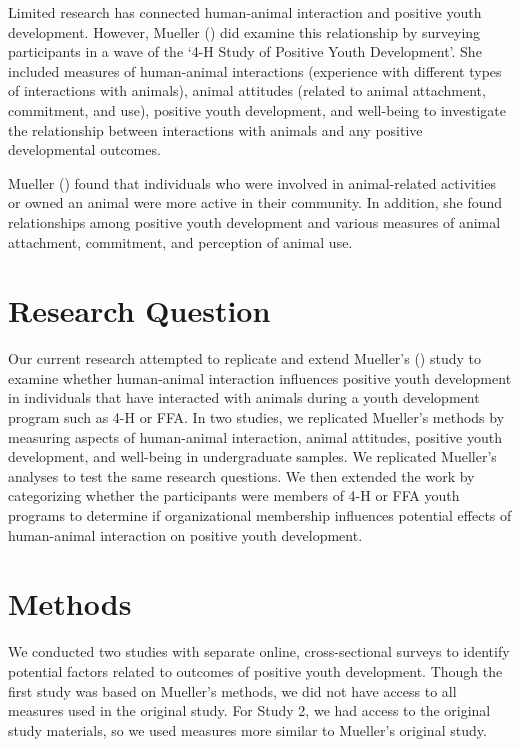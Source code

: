 \documentclass[
  jou,
  longtable,
  nolmodern,
  notxfonts,
  notimes,
  colorlinks=true,linkcolor=blue,citecolor=blue,urlcolor=blue]{apa7}
\begin{document}
Limited research has connected human-animal interaction and positive
youth development. However, Mueller ()
did examine this relationship by surveying participants in a wave of the
`4-H Study of Positive Youth Development'. She included measures of
human-animal interactions (experience with different types of
interactions with animals), animal attitudes (related to animal
attachment, commitment, and use), positive youth development, and
well-being to investigate the relationship between interactions with
animals and any positive developmental outcomes.

Mueller () found that individuals who
were involved in animal-related activities or owned an animal were more
active in their community. In addition, she found relationships among
positive youth development and various measures of animal attachment,
commitment, and perception of animal use.

\section{Research Question}\label{research-question}

Our current research attempted to replicate and extend Mueller's
() study to examine whether
human-animal interaction influences positive youth development in
individuals that have interacted with animals during a youth development
program such as 4-H or FFA. In two studies, we replicated Mueller's
methods by measuring aspects of human-animal interaction, animal
attitudes, positive youth development, and well-being in undergraduate
samples. We replicated Mueller's analyses to test the same research
questions. We then extended the work by categorizing whether the
participants were members of 4-H or FFA youth programs to determine if
organizational membership influences potential effects of human-animal
interaction on positive youth development.

\section{Methods}\label{methods}

We conducted two studies with separate online, cross-sectional surveys
to identify potential factors related to outcomes of positive youth
development. Though the first study was based on Mueller's methods, we
did not have access to all measures used in the original study. For
Study 2, we had access to the original study materials, so we used
measures more similar to Mueller's original study.
\end{document}

